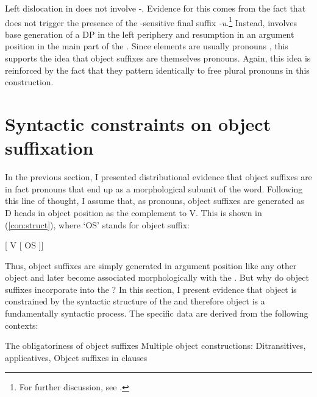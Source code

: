 \documentclass[output=paper,
modfonts
]{langscibook}
\begin{document}
\noindent Left dislocation in  does not involve \abar-. Evidence for this comes from the fact that  does not trigger the presence of the \abar-sensitive final suffix \textit{-u}.\footnote{For further discussion, see \citet{Baier:2014}.} Instead,  involves base generation of a DP in the left periphery and resumption in an argument position in the main part of the . Since  elements are usually pronouns \citep{McCloskey:2006a}, this supports the idea that object suffixes are themselves pronouns. Again, this idea is reinforced by the fact that they pattern identically to free plural pronouns in this construction.


\section{Syntactic constraints on object suffixation}\label{sec:baier:3}

In the previous section, I presented distributional evidence that object suffixes are in fact pronouns that end up as a morphological subunit of the  word. Following this line of thought, I assume that, as pronouns, object suffixes are generated as D heads in object position as the complement to V. This is shown in (\ref{con:struct}), where `OS' stands for object suffix:

\begin{exe}
\ex \label{con:struct} {[ V [ OS ]]}
\end{exe}

\noindent Thus, object suffixes are simply generated in argument position like any other object and later become associated morphologically with the . But why do object suffixes incorporate into the ? In this section, I present evidence that object  is constrained by the syntactic structure of the  and therefore object  is a fundamentally syntactic process. The specific data are derived from the following contexts:

\begin{exe}
\ex 
\begin{xlista}
\ex The obligatoriness of object suffixes
\ex Multiple object constructions: Ditransitives, applicatives, 
\ex Object suffixes in  clauses
\end{xlista}
\end{exe}
\end{document}
